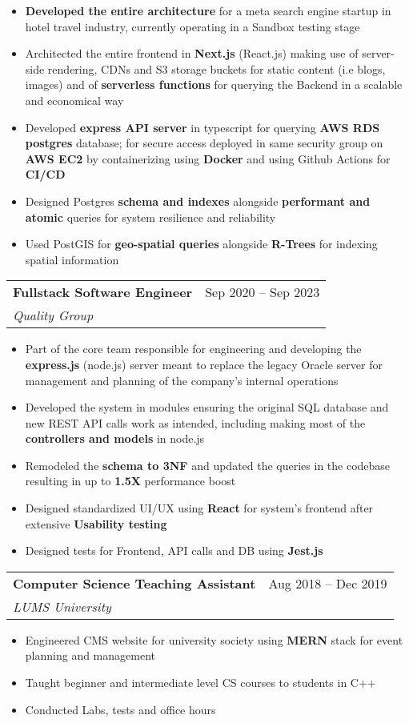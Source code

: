 \documentclass[letterpaper,11pt]{article}
\makeatletter
\newcommand{\resumeItem}[1]{
  \item\small{
    {#1 \vspace{-2pt}}
  }
}
\newcommand{\resumeSubheading}[4]{
  \vspace{-2pt}\item
    \begin{tabular*}{0.97\textwidth}[t]{l@{\extracolsep{\fill}}r}
      \textbf{#1} & #2 \\
      \textit{\small#3} & \textit{\small #4} \\
    \end{tabular*}\vspace{-7pt}
}
\newcommand{\resumeItemListStart}{\begin{itemize}}
\newcommand{\resumeItemListEnd}{\end{itemize}\vspace{-5pt}}
\makeatother
\begin{document}
\resumeItemListStart
\resumeItem{\textbf{Developed the entire architecture} for a meta search engine startup in hotel travel industry, currently operating in a Sandbox testing stage}
\resumeItem{Architected the entire frontend in \textbf{Next.js} (React.js) making use of server-side rendering, CDNs and S3 storage buckets for static content (i.e blogs, images) and of \textbf{serverless functions} for querying the Backend in a scalable and economical way}
\resumeItem{Developed \textbf{express API server} in typescript for querying \textbf{AWS RDS postgres} database; for secure access deployed in same security group on \textbf{AWS EC2} by containerizing using \textbf{Docker} and using Github Actions for \textbf{CI/CD}}
\resumeItem{Designed Postgres \textbf{schema and indexes} alongside \textbf{performant and atomic} queries for system resilience and reliability}
\resumeItem{Used PostGIS for \textbf{geo-spatial queries} alongside \textbf{R-Trees} for indexing spatial information}
\resumeItemListEnd

\resumeSubheading
{Fullstack Software Engineer}{Sep 2020 -- Sep 2023} %
{Quality Group}{}
\resumeItemListStart
\resumeItem{Part of the core team responsible for engineering and developing the \textbf{express.js} (node.js) server meant to replace the legacy Oracle server for management and planning of the company's internal operations}
\resumeItem{Developed the system in modules ensuring the original SQL database and new REST API calls work as intended, including making most of the \textbf{controllers and models} in node.js}
\resumeItem{Remodeled the \textbf{schema to 3NF} and updated the queries in the codebase resulting in up to \textbf{1.5X} performance boost}
\resumeItem{Designed standardized UI/UX using \textbf{React} for system's frontend after extensive \textbf{Usability testing}}
\resumeItem{Designed tests for Frontend, API calls and DB using \textbf{Jest.js}}
\resumeItemListEnd

\resumeSubheading
{Computer Science Teaching Assistant}{Aug 2018 -- Dec 2019}
{LUMS University}{}
\resumeItemListStart
\resumeItem{Engineered CMS website for university society using \textbf{MERN} stack for event planning and management}
\resumeItem{Taught beginner and intermediate level CS courses to students in C++}
\resumeItem{Conducted Labs, tests and office hours}
\resumeItemListEnd
\end{document}
